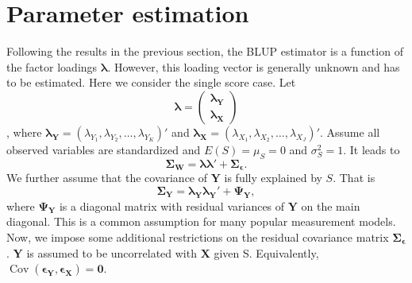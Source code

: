 \documentclass[man, floatsintext]{apa7}
\newcommand{\mbf}[1]{\bm{#1}}
\newcommand{\bX}{\mbf{X}}
\newcommand{\bY}{\mbf{Y}}
\newcommand{\beps}{\mbf{\epsilon}}
\newcommand{\blambda}{\mbf{\lambda}}
\newcommand{\bW}{\mbf{W}}
\DeclareMathOperator{\Cov}{Cov}
\begin{document}
  \section{Parameter estimation}
  \label{app:estimation}
  Following the results in the previous section, the BLUP estimator is a function of the factor loadings $\blambda$. However, this loading vector is generally unknown and has to be estimated. Here we consider the single score case.
  Let \[ \blambda = \left (\begin{array}{r} \blambda_{\bY} \\ \blambda_{\bX} \end{array} \right) \],
  where $\blambda_{\bY} = (\lambda_{Y_1}, \lambda_{Y_2}, \dots, \lambda_{Y_K})'$
  and $\blambda_{\bX} = (\lambda_{X_1}, \lambda_{X_2}, \dots, \lambda_{X_J})'$.
  Assume all observed variables are standardized and $E(S) = \mu_S = 0$ and
  $\sigma^2_{S} = 1$. It leads to
  \begin{equation} 
  \mbf{\Sigma}_{\bW} = \blambda \blambda' + \mbf{\Sigma}_{\beps}.
  \end{equation}
  We further assume that the covariance of $\bY$ is fully explained by $S$. That is
  \begin{equation}
    \mbf{\Sigma}_{\bY} = \blambda_{\bY} \blambda_{\bY}' + \mbf{\Psi}_{\bY},
  \end{equation}
  where $\mbf{\Psi}_{\bY}$ is a diagonal matrix with residual variances of $\bY$
  on the main diagonal. This is a common assumption for many popular measurement
  models. Now, we impose some additional restrictions on the residual covariance
  matrix $\mbf{\Sigma}_{\beps}$. $\bY$ is assumed to be uncorrelated with $\bX$
  given S. Equivalently, $\Cov(\beps_{\bY}, \beps_{\bX}) = \mbf{0}$.
\end{document}

